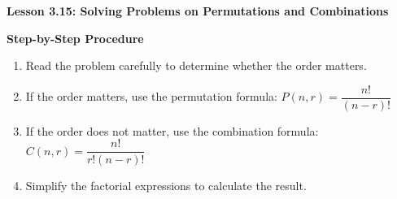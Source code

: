 \begin{center}
\textbf{Lesson 3.15: Solving Problems on Permutations and Combinations}
\end{center}

\vspace*{-1.5ex}

\noindent\textbf{Step-by-Step Procedure}

\begin{enumerate}
    \item Read the problem carefully to determine whether the order matters.
    \item If the order matters, use the permutation formula: \quad \(P(n, r) = \dfrac{n!}{(n-r)!}\)
  
    \item If the order does not matter, use the combination formula: \quad \(C(n, r) = \dfrac{n!}{r!(n-r)!}\)
  
    \item Simplify the factorial expressions to calculate the result.
\end{enumerate}

